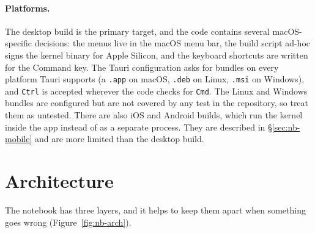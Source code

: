 \paragraph{Platforms.} The desktop build is the primary target, and the code
contains several macOS-specific decisions: the menus live in the macOS menu
bar, the build script ad-hoc signs the kernel binary for Apple
Silicon, and the keyboard shortcuts are written for the Command key.
 The Tauri configuration asks for bundles on every
platform Tauri supports (a \texttt{.app} on macOS, \texttt{.deb} on Linux,
\texttt{.msi} on Windows), and \texttt{Ctrl} is accepted wherever the code
checks for \texttt{Cmd}. The Linux and Windows bundles are configured but are
not covered by any test in the repository, so treat them as untested. There
are also iOS and Android builds, which run the kernel inside the app instead
of as a separate process. They are described in \S\ref{sec:nb-mobile} and are
more limited than the desktop build.

\section{Architecture}
\label{sec:nb-architecture}

The notebook has three layers, and it helps to keep them apart when something
goes wrong (Figure~\ref{fig:nb-arch}).

